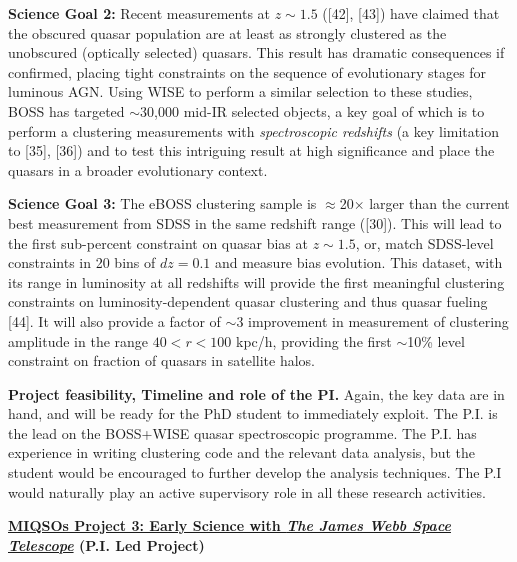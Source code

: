 \documentclass[oneside, a4paper, onecolumn, 11pt]{article}
\begin{document}
\smallskip
\smallskip
\noindent
{\bf Science Goal 2:}
Recent measurements at $z\sim1.5$ ([42], [43]) have claimed that the
obscured quasar population are at least as strongly clustered as the
unobscured (optically selected) quasars. This result has dramatic
consequences if confirmed, placing tight constraints on the sequence
of evolutionary stages for luminous AGN. Using WISE to perform a
similar selection to these studies, BOSS has targeted $\sim$30,000
mid-IR selected objects, a key goal of which is to perform a
clustering measurements with {\it spectroscopic redshifts} (a key
limitation to [35], [36]) and to test this intriguing result at high
significance and place the quasars in a broader evolutionary context.

\smallskip
\smallskip
\noindent
{\bf Science Goal 3:}
The eBOSS clustering sample is $\approx$20$\times$ larger than the
current best measurement from SDSS in the same redshift range
([30]). This will lead to the first sub-percent constraint on quasar
bias at $z\sim1.5$, or, match SDSS-level constraints in 20 bins of
$dz=0.1$ and measure bias evolution.
This dataset, with its range in luminosity at all redshifts will
provide the first meaningful clustering constraints on
luminosity-dependent quasar clustering and thus quasar fueling [44].  It
will also provide a factor of $\sim$3 improvement in measurement of
clustering amplitude in the range $40 < r < 100$ kpc/h, providing the
first $\sim$10\% level constraint on fraction of quasars in satellite
halos.

\smallskip
\smallskip
\noindent
{\bf Project feasibility, Timeline and role of the PI.}
Again, the key data are in hand, and will be ready for the PhD student to
immediately exploit. The P.I. is the lead on the BOSS+WISE quasar spectroscopic programme.
The P.I. has experience in writing clustering code and the relevant
data analysis, but the student would be encouraged to further develop the
analysis techniques. 
The P.I would naturally play an active supervisory role in all these research activities.

\medskip
\medskip

\smallskip
\smallskip
\noindent
{\bf \underline {\large MIQSOs Project 3:  Early Science with {\it The James Webb Space Telescope}} (P.I. Led Project)}
\end{document}
